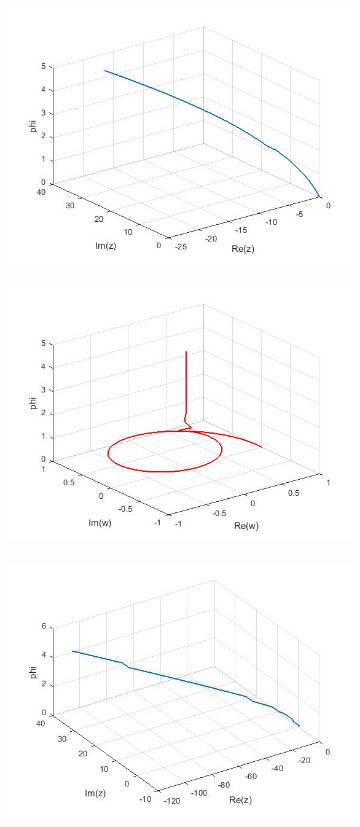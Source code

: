\documentclass[a4paper,11pt]{article}
\begin{document}
\begin{figure}[!h]
\begin{subfigure}[c]{0.5\textwidth}
\includegraphics[width=\linewidth]{5.jpg}
\end{subfigure}
\begin{subfigure}[c]{0.5\textwidth}
\includegraphics[width=\linewidth]{6.jpg}
\end{subfigure}
\begin{subfigure}[c]{0.5\textwidth}
\includegraphics[width=\linewidth]{11.jpg}

\end{subfigure}
\end{figure}
\end{document}
